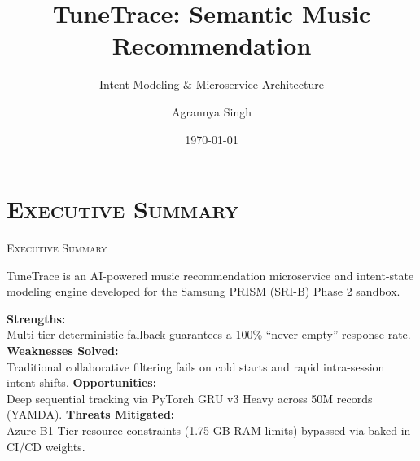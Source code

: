 \documentclass[xcolor=dvipsnames, aspectratio=1610]{beamer}
\title[TuneTrace]{TuneTrace: Semantic Music Recommendation}
\subtitle{Intent Modeling \& Microservice Architecture}
\author[A. Singh]{Agrannya Singh}
\institute[VIT]{VIT Vellore}
\date{\today}
\begin{document}
\begin{frame}[plain]
  \slatetitlepage
\end{frame}

\section{\textsc{Executive Summary}}
\begin{frame}{\textsc{Executive Summary}}

  TuneTrace is an AI-powered music recommendation microservice and intent-state modeling engine developed for the Samsung PRISM (SRI-B) Phase 2 sandbox.

  \vspace{5mm}
  \swot
    {\scriptsize \textbf{Strengths:} \\ Multi-tier deterministic fallback guarantees a 100\% ``never-empty'' response rate.}
    {\scriptsize \textbf{Weaknesses Solved:} \\ Traditional collaborative filtering fails on cold starts and rapid intra-session intent shifts.}
    {\scriptsize \textbf{Opportunities:} \\ Deep sequential tracking via PyTorch GRU v3 Heavy across 50M records (YAMDA).}
    {\scriptsize \textbf{Threats Mitigated:} \\ Azure B1 Tier resource constraints (1.75 GB RAM limits) bypassed via baked-in CI/CD weights.}

\end{frame}

\end{document}
